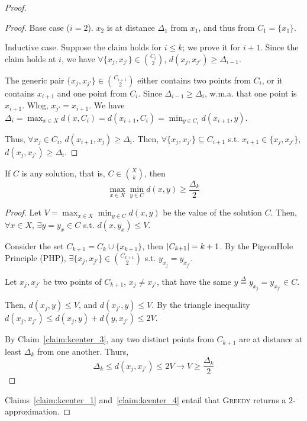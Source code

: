 \begin{proof}
\begin{proof}
            Base case ($i=2$).
            $x_2$ is at distance $\Delta_1$ from $x_1$, and thus from $C_1 = \{x_1\}$.

            Inductive case. Suppose the claim holds for $i \leq k$; we prove it for $i+1$.
            Since the claim holds at $i$, we have $\forall \{ x_j, x_{j'} \} \in \binom{C_i}{2}$, $d(x_j, x_{j'}) \geq \Delta_{i-1}$.

            The generic pair $\{ x_j, x_{j'} \} \in \binom{C_{i+1}}{2}$ either contains two points from $C_i$, or it contains $x_{i+1}$ and one point from $C_i$.
            Since $\Delta_{i-1} \geq \Delta_i$, w.m.a. that one point is $x_{i+1}$. Wlog, $x_{j'} = x_{i+1}$.
            We have $\Delta_i = \max_{x \in X} d(x, C_i) = d(x_{i+1}, C_i) = \min_{y \in C_i} d(x_{i+1}, y)$.

            Thus, $\forall x_j \in C_i$, $d(x_{i+1}, x_j) \geq \Delta_i$.
            Then, $\forall \{ x_j, x_{j'} \} \subseteq C_{i+1}$ s.t. $x_{i+1} \in \{ x_j, x_{j'} \}$, $d( x_j, x_{j'} ) \geq \Delta_i$.
        \end{proof}

        \begin{claim}\label{claim:kcenter_4}
            If $C$ is any solution, that is, $C \in \binom{X}{k}$, then
            \[ \max_{x \in X} \min_{y \in C} d(x,y) \geq \frac{\Delta_k}{2} \]
        \end{claim}
        \begin{proof}
            Let $V = \max_{x \in X} \min_{y \in C} d(x,y)$ be the value of the solution $C$.
            Then, $\forall x \in X$, $\exists y = y_x \in C$ s.t. $d(x, y_x) \leq V$.

            Consider the set $C_{k+1} = C_k \cup \{ x_{k+1} \}$, then $\vert C_{k+1} \vert = k+1$.
            By the PigeonHole Principle (PHP), $\exists \{ x_j, x_{j'} \} \in \binom{C_{k+1}}{2}$ s.t. $y_{x_j} = y_{x_{j'}}$.

            Let $x_j, x_{j'}$ be two points of $C_{k+1}$, $x_j \neq x_{j'}$, that have the same $y \overset{\Delta}{=} y_{x_j} = y_{x_{j'}} \in C$.

            Then, $d(x_j, y) \leq V$, and $d(x_{j'}, y) \leq V$.
            By the triangle inequality $d(x_j, x_{j'}) \leq d(x_j, y) + d(y, x_{j'}) \leq 2V$.

            By Claim~\ref{claim:kcenter_3}, any two distinct points from $C_{k+1}$ are at distance at least $\Delta_k$ from one another.
            Thurs,
            \[ \Delta_k \leq d(x_j, x_{j'}) \leq 2V \rightarrow V \geq \frac{\Delta_k}{2} \]
        \end{proof}

        Claims~\ref{claim:kcenter_1} and~\ref{claim:kcenter_4} entail that \textsc{Greedy} returns a $2$-approximation.
    \end{proof}

